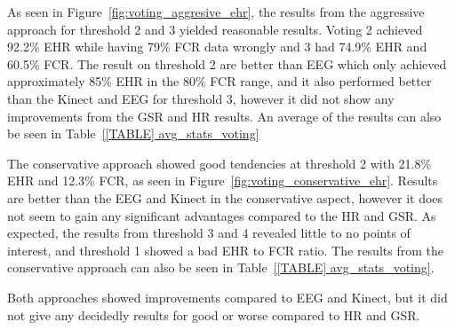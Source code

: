 As seen in Figure~\ref{fig:voting_aggresive_ehr}, the results from the aggressive approach for threshold 2 and 3 yielded reasonable results.
Voting 2 achieved 92.2\% EHR while having 79\% FCR data wrongly and 3 had 74.9\% EHR and 60.5\% FCR.
The result on threshold 2 are better than EEG which only achieved approximately 85\% EHR in the 80\% FCR range, and it
also performed better than the Kinect and EEG for threshold 3, however it did not show any improvements from the GSR and
HR results.
An average of the results can also be seen in Table~\ref{[TABLE] avg_stats_voting}

The conservative approach showed good tendencies at threshold 2 with 21.8\% EHR and 12.3\% FCR, as seen in Figure~\ref{fig:voting_conservative_ehr}.
Results are better than the EEG and Kinect in the conservative aspect, however it does not seem to gain any significant advantages compared to the HR and GSR.
As expected, the results from threshold 3 and 4 revealed little to no points of interest, and threshold 1 showed a bad EHR to FCR ratio. 
The results from the conservative approach can also be seen in Table~\ref{[TABLE] avg_stats_voting}.

Both approaches showed improvements compared to EEG and Kinect, but it did not give any decidedly results for good or worse compared
to HR and GSR.

